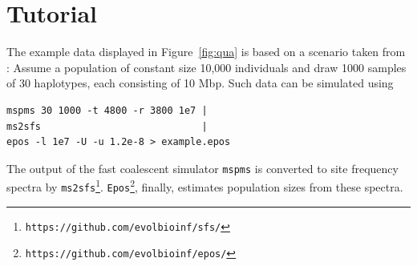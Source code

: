 \documentclass[a4paper]{article}
\newcommand{\ty}{\texttt}
\begin{document}
\section{Tutorial}
The example data displayed in Figure~\ref{fig:qua} is based on a
scenario taken from \citep[Figure 2a]{liu15:exp}: Assume a population
of constant size 10,000 individuals and draw 1000 samples of 30
haplotypes, each consisting of 10 Mbp. Such data can be simulated using
\begin{verbatim}
mspms 30 1000 -t 4800 -r 3800 1e7 |
ms2sfs                            |
epos -l 1e7 -U -u 1.2e-8 > example.epos
\end{verbatim}
The output of the fast coalescent simulator \ty{mspms} \citep{kel16:eff} is
converted to site frequency spectra by
\ty{ms2sfs}\footnote{\ty{https://github.com/evolbioinf/sfs/}}. \ty{Epos}\footnote{\ty{https://github.com/evolbioinf/epos/}},
finally, estimates population sizes from these spectra.
\end{document}
